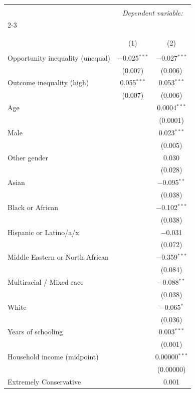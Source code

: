 
\begin{table}[H] \centering 
  \caption{} 
  \label{} 
\tiny 
\begin{tabular}{@{\extracolsep{5pt}}lcc} 
\\[-1.8ex]\hline 
\hline \\[-1.8ex] 
 & \multicolumn{2}{c}{\textit{Dependent variable:}} \\ 
\cline{2-3} 
\\[-1.8ex] & \multicolumn{2}{c}{} \\ 
\\[-1.8ex] & (1) & (2)\\ 
\hline \\[-1.8ex] 
 Opportunity inequality (unequal) & $-$0.025$^{***}$ & $-$0.027$^{***}$ \\ 
  & (0.007) & (0.006) \\ 
  Outcome inequality (high) & 0.055$^{***}$ & 0.053$^{***}$ \\ 
  & (0.007) & (0.006) \\ 
  Age &  & 0.0004$^{***}$ \\ 
  &  & (0.0001) \\ 
  Male &  & 0.023$^{***}$ \\ 
  &  & (0.005) \\ 
  Other gender &  & 0.030 \\ 
  &  & (0.028) \\ 
  Asian &  & $-$0.095$^{**}$ \\ 
  &  & (0.038) \\ 
  Black or African &  & $-$0.102$^{***}$ \\ 
  &  & (0.038) \\ 
  Hispanic or Latino/a/x &  & $-$0.031 \\ 
  &  & (0.072) \\ 
  Middle Eastern or North African &  & $-$0.359$^{***}$ \\ 
  &  & (0.084) \\ 
  Multiracial / Mixed race &  & $-$0.088$^{**}$ \\ 
  &  & (0.038) \\ 
  White &  & $-$0.065$^{*}$ \\ 
  &  & (0.036) \\ 
  Years of schooling &  & 0.003$^{***}$ \\ 
  &  & (0.001) \\ 
  Household income (midpoint) &  & 0.00000$^{***}$ \\ 
  &  & (0.00000) \\ 
  Extremely Conservative &  & 0.001 \\ 

\end{tabular}
\end{table}
